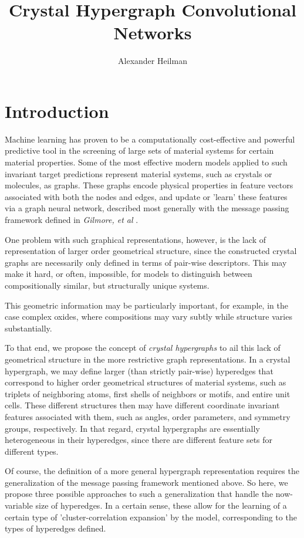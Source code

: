 \documentclass[10pt,a4paper]{article}
\title{Crystal Hypergraph Convolutional Networks}
\author{Alexander Heilman}
\begin{document}
\maketitle
\section{Introduction}
Machine learning has proven to be a computationally cost-effective and powerful predictive tool in the screening of large sets of material systems for certain material properties. Some of the most effective modern models applied to such invariant target predictions represent material systems, such as crystals or molecules, as graphs. These graphs encode physical properties in feature vectors associated with both the nodes and edges, and update or 'learn' these features via a graph neural network, described most generally with the message passing framework defined in \textit{Gilmore, et al} \cite{mpnn}. 

One problem with such graphical representations, however, is the lack of representation of larger order geometrical structure, since the constructed crystal graphs are necessarily only defined in terms of pair-wise descriptors. This may make it hard, or often, impossible, for models to distinguish between compositionally similar, but structurally unique systems. 

This geometric information may be particularly important, for example, in the case complex oxides, where compositions may vary subtly while structure varies substantially.

To that end, we propose the concept of \textit{crystal hypergraphs} to ail this lack of geometrical structure in the more restrictive graph representations. In a crystal hypergraph, we may define larger (than strictly pair-wise) hyperedges that correspond to higher order geometrical structures of material systems, such as triplets of neighboring atoms, first shells of neighbors or motifs, and entire unit cells. These different structures then may have different coordinate invariant features associated with them, such as angles, order parameters, and symmetry groups, respectively. In that regard, crystal hypergraphs are essentially heterogeneous in their hyperedges, since there are different feature sets for different types.

Of course, the definition of a more general hypergraph representation requires the generalization of the message passing framework mentioned above. So here, we propose three possible approaches to such a generalization that handle the now-variable size of hyperedges. In a certain sense, these allow for the learning of a certain type of 'cluster-correlation expansion' by the model, corresponding to the types of hyperedges defined.
\end{document}
